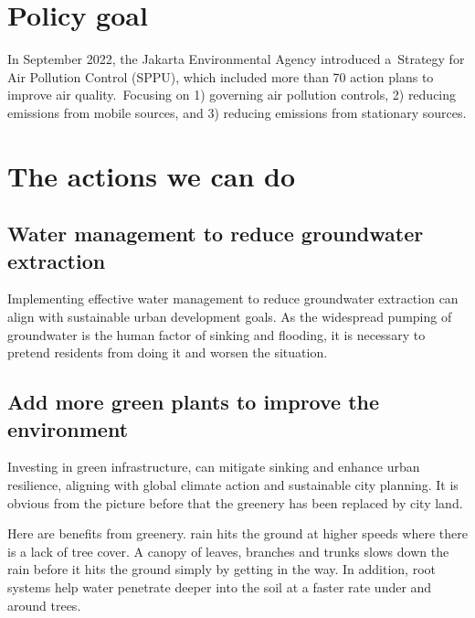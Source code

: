 \documentclass[
  letterpaper,
  DIV=11,
  numbers=noendperiod]{scrreprt}
\begin{document}

\chapter{Policy goal}\label{policy-goal}

In September 2022, the Jakarta Environmental Agency introduced
a~Strategy for Air Pollution Control (SPPU), which included more than 70
action plans to improve air quality.~Focusing on 1) governing air
pollution controls, 2) reducing emissions from mobile sources, and 3)
reducing emissions from stationary sources.


\chapter{The actions we can do}\label{the-actions-we-can-do}

\section{Water management to reduce groundwater
extraction}\label{water-management-to-reduce-groundwater-extraction}

Implementing effective water management to reduce groundwater extraction
can align with sustainable urban development goals. As the widespread
pumping of groundwater is the human factor of sinking and flooding, it
is necessary to pretend residents from doing it and worsen the
situation.

\section{Add more green plants to improve the
environment}\label{add-more-green-plants-to-improve-the-environment}

Investing in green infrastructure, can mitigate sinking and enhance
urban resilience, aligning with global climate action and sustainable
city planning. It is obvious from the picture before that the greenery
has been replaced by city land.

Here are benefits from greenery. rain hits the ground at higher speeds
where there is a lack of tree cover. A canopy of leaves, branches and
trunks slows down the rain before it hits the ground simply by getting
in the way. In addition, root systems help water penetrate deeper into
the soil at a faster rate under and around trees.
\end{document}
